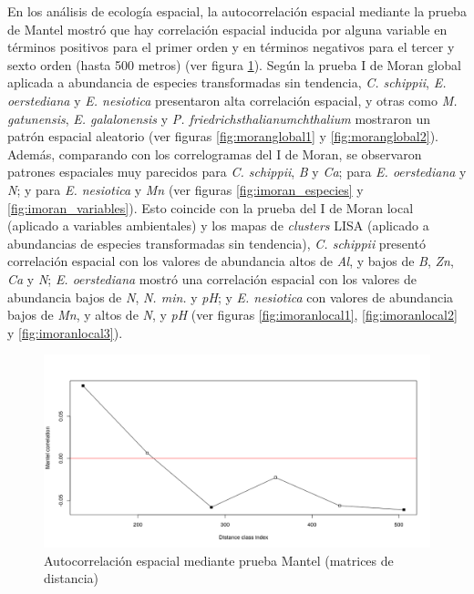 \documentclass[11pt,]{article}
\begin{document}
En los análisis de ecología espacial, la autocorrelación espacial
mediante la prueba de Mantel mostró que hay correlación espacial
inducida por alguna variable en términos positivos para el primer orden
y en términos negativos para el tercer y sexto orden (hasta 500 metros)
(ver figura \ref{fig:prueba_mantel}). Según la prueba I de Moran global
aplicada a abundancia de especies transformadas sin tendencia, \emph{C.
schippii}, \emph{E. oerstediana} y \emph{E. nesiotica} presentaron alta
correlación espacial, y otras como \emph{M. gatunensis}, \emph{E.
galalonensis} y \emph{P. friedrichsthalianumchthalium} mostraron un
patrón espacial aleatorio (ver figuras \ref{fig:moranglobal1} y
\ref{fig:moranglobal2}). Además, comparando con los correlogramas del I
de Moran, se observaron patrones espaciales muy parecidos para \emph{C.
schippii}, \emph{B} y \emph{Ca}; para \emph{E. oerstediana} y \emph{N};
y para \emph{E. nesiotica} y \emph{Mn} (ver figuras
\ref{fig:imoran_especies} y \ref{fig:imoran_variables}). Esto coincide
con la prueba del I de Moran local (aplicado a variables ambientales) y
los mapas de \emph{clusters} LISA (aplicado a abundancias de especies
transformadas sin tendencia), \emph{C. schippii} presentó correlación
espacial con los valores de abundancia altos de \emph{Al}, y bajos de
\emph{B}, \emph{Zn}, \emph{Ca} y \emph{N}; \emph{E. oerstediana} mostró
una correlación espacial con los valores de abundancia bajos de
\emph{N}, \emph{N. min.} y \emph{pH}; y \emph{E. nesiotica} con valores
de abundancia bajos de \emph{Mn}, y altos de \emph{N}, y \emph{pH} (ver
figuras \ref{fig:imoranlocal1}, \ref{fig:imoranlocal2} y
\ref{fig:imoranlocal3}).

\begin{figure}
\centering
\includegraphics{prueba_mantel.png}
\caption{Autocorrelación espacial mediante prueba Mantel (matrices de
distancia) \label{fig:prueba_mantel}}
\end{figure}
\end{document}

